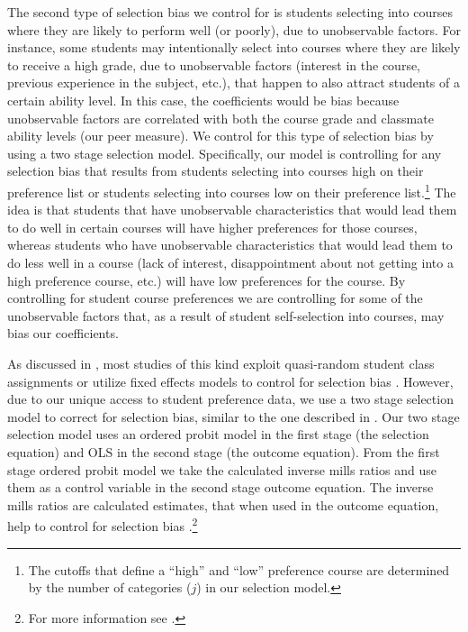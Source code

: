 The second type of selection bias we control for is students selecting into courses where they are likely to perform well (or poorly), due to unobservable factors. 
For instance, some students may intentionally select into courses where they are likely to receive a high grade, due to unobservable factors (interest in the course, previous experience in the subject, etc.), that happen to also attract students of a certain ability level.
In this case, the coefficients would be bias because unobservable factors are correlated with both the course grade and classmate ability levels (our peer measure).
We control for this type of selection bias by using a two stage selection model.
Specifically, our model is controlling for any selection bias that results from students selecting into courses high on their preference list or students selecting into courses low on their preference list.\footnote{The cutoffs that define a ``high'' and ``low'' preference course are determined by the number of categories ($j$) in our selection model.} 
The idea is that students that have unobservable characteristics that would lead them to do well in certain courses will have higher preferences for those courses, whereas students who have unobservable characteristics that would lead them to do less well in a course (lack of interest, disappointment about not getting into a high preference course, etc.) will have low preferences for the course.
By controlling for student course preferences we are controlling for some of the unobservable factors that, as a result of student self-selection into courses, may bias our coefficients.

As discussed in , most studies of this kind exploit quasi-random student class assignments or utilize fixed effects models to control for selection bias \citep{kang2007classroom,carman2012classroom,schlosser2008inside,lavy2012good}. 
However, due to our unique access to student preference data, we use a two stage selection model to correct for selection bias, similar to the one described in \citet{heckman1979sample}. 
Our two stage selection model uses an ordered probit model in the first stage (the selection equation) and OLS in the second stage (the outcome equation). 
From the first stage ordered probit model we take the calculated inverse mills ratios and use them as a control variable in the second stage outcome equation. 
The inverse mills ratios are calculated estimates, that when used in the outcome equation, help to control for selection bias \citep{heckman1979sample}.\footnote{For more information see \citet{greene2002limdep}.}

